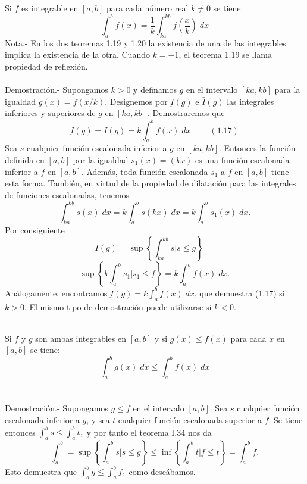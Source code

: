 \begin{multicols}{2}
\begin{teo} Si $f$ es integrable en $[a,b]$ para cada número real $k\neq 0$ se tiene: $$\int_a^b f(x) = \dfrac{1}{k} \int_{ka}^{kb} f\left(\dfrac{x}{k}\right)\; dx$$
    Nota.-\; En los dos teoremas 1.19 y 1.20 la existencia de una de las integrables implica la existencia de la otra. Cuando $k=-1$, el teorema 1.19 se llama propiedad de reflexión.\\\\
    Demostración.-\; Supongamos $k>0$ y definamos $g$ en el intervalo $[ka,kb]$ para la igualdad $g(x)=f(x/k)$. Designemos por $\underbar{I}(g)$ e $\bar{I}(g)$ las integrales inferiores y superiores de $g$ en $[ka,kb]$. Demostraremos que $$\underbar{I}(g) = \bar{I}(g) = k \int_a^b f(x) \; dx. \qquad (1.17)$$
    Sea $s$ cualquier función escalonada inferior a $g$ en $[ka,kb]$. Entonces la función definida en $[a,b]$ por la igualdad $s_1(x) = (kx)$ es una función escalonada inferior a $f$ en $[a,b]$. Además, toda función escalonada $s_1$ a $f$ en $[a,b]$ tiene esta forma. También, en virtud de la propiedad de dilatación para las integrales de funciones escalonadas, tenemos 
    $$\int_{ka}^{kb} s(x)\; dx = k \int_a^b s(kx)\; dx = k \int_a^b s_1(x) \; dx.$$
    Por consiguiente $$\underbar{I}(g) = \sup\left\{\int_{ka}^{kb} s | s\leq g\right\} =$$$$ \sup\left\{ k \int_a^b s_1 | s_1\leq f\right\} = k \int_a^b f(x) \; dx.$$
    Análogamente, encontramos $\underbar{I}(g) = k \int_a^b f(x)\; dx$, que demuestra (1.17) si $k>0.$ El mismo tipo de demostración puede utilizarse si $k<0$.\\\\

\end{teo}

\begin{teo} Si $f$ y $g$ son ambas integrables en $[a,b]$ y si $g(x)\leq f(x)$ para cada $x$ en $[a,b]$ se tiene: $$\int_a^b g(x)\; dx \leq \int_a^b f(x)\; dx$$\\\\
    Demostración.-\; Supongamos $g\leq f$ en el intervalo $[a,b]$. Sea $s$ cualquier función escalonada inferior a $g$, y sea $t$ cualquier función escalonada superior a $f$. Se tiene entonces $\int_a^b s \leq \int_a^b t,$ y por tanto el teorema I.34 nos da 
    $$\int_a^b = \sup \left\{\int_a^b s | s\leq g \right\} \leq \inf \left\{\int_a^b t | f\leq t\right\} = \int_a^b f.$$
    Esto demuestra que $\int_a^b g \leq \int_a^b f,$ como deseábamos.\\\\

\end{teo}

\end{multicols}

